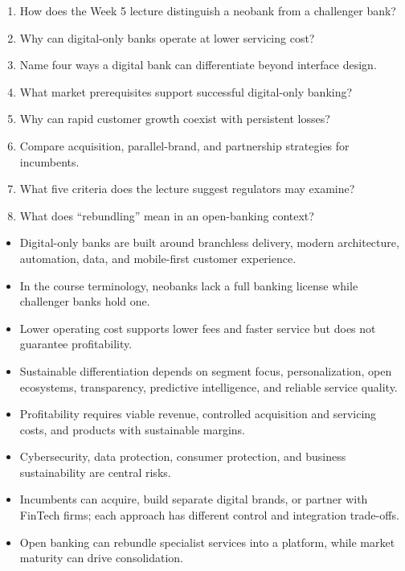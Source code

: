 \begin{quickcheck}
\begin{enumerate}
  \item How does the Week 5 lecture distinguish a neobank from a challenger bank?
  \item Why can digital-only banks operate at lower servicing cost?
  \item Name four ways a digital bank can differentiate beyond interface design.
  \item What market prerequisites support successful digital-only banking?
  \item Why can rapid customer growth coexist with persistent losses?
  \item Compare acquisition, parallel-brand, and partnership strategies for incumbents.
  \item What five criteria does the lecture suggest regulators may examine?
  \item What does ``rebundling'' mean in an open-banking context?
\end{enumerate}
\end{quickcheck}

\begin{chapterrecap}
\begin{itemize}
  \item Digital-only banks are built around branchless delivery, modern architecture, automation, data, and mobile-first customer experience.
  \item In the course terminology, neobanks lack a full banking license while challenger banks hold one.
  \item Lower operating cost supports lower fees and faster service but does not guarantee profitability.
  \item Sustainable differentiation depends on segment focus, personalization, open ecosystems, transparency, predictive intelligence, and reliable service quality.
  \item Profitability requires viable revenue, controlled acquisition and servicing costs, and products with sustainable margins.
  \item Cybersecurity, data protection, consumer protection, and business sustainability are central risks.
  \item Incumbents can acquire, build separate digital brands, or partner with FinTech firms; each approach has different control and integration trade-offs.
  \item Open banking can rebundle specialist services into a platform, while market maturity can drive consolidation.
\end{itemize}
\end{chapterrecap}


